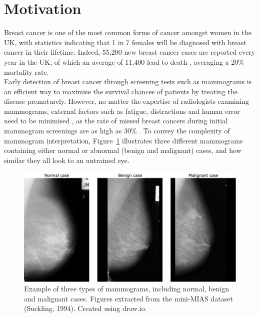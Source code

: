 \section{Motivation}

Breast cancer is one of the most common forms of cancer amongst women in the UK, with statistics indicating that 1 in 7 females will be diagnosed with breast cancer in their lifetime. Indeed, 55,200 new breast cancer cases are reported every year in the UK, of which an average of 11,400 lead to death \citep{BreastCancerResearchUK}, averaging a 20\% mortality rate.\\

Early detection of breast cancer through screening tests such as mammograms is an efficient way to maximise the survival chances of patients by treating the disease prematurely. However, no matter the expertise of radiologists examining mammograms, external factors such as fatigue, distractions and human error need to be minimised \citep{Polat2007}, as the rate of missed breast cancers during initial mammogram screenings  are as high as 30\% \citep{Elter2009}. To convey the complexity of mammogram interpretation, Figure~\ref{fig:introduction-mammogram-examples} illustrates three different mammograms containing either normal or abnormal (benign and malignant) cases, and how similar they all look to an untrained eye.\\

\begin{figure}[ht]
\centerline{\includegraphics[width=\textwidth]{Dissertation/figures/introduction/mammogram examples.png}}
\caption{\label{fig:introduction-mammogram-examples}Example of three types of mammograms, including normal, benign and malignant cases. Figures extracted from the mini-MIAS dataset (Suckling, 1994). Created using draw.io.}
\end{figure}

